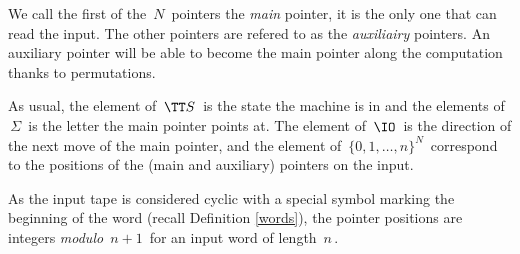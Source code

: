 We call the first of the $\,N\,$ pointers the \emph{main} pointer, it is the only one that can read the input.
The other pointers are refered to as the \emph{auxiliairy} pointers.
An auxiliary pointer will be able to become the main pointer along the computation thanks to permutations.


As usual, the element of $\,\TT S\,$ is the state the machine is in and the elements of $\,\Sigma\,$ is the letter the main pointer points at.
The element of $\,\IO\,$ is the direction of the next move of the main pointer, and the element of $\,\{0,1,\dots,n\}^N\,$ correspond to the positions of the (main and auxiliary)  pointers on the input.

\smallskip

As the input tape is considered cyclic with a special symbol marking the beginning of the word (recall Definition \ref{words}), the pointer positions are integers \emph{modulo} $\,n+1\,$ for an input word of length $\,n\,$.

